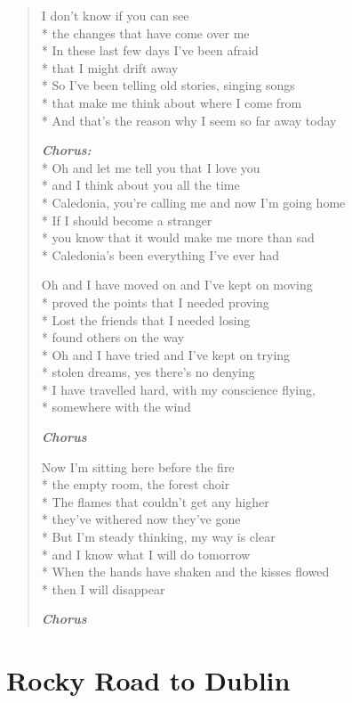 \documentclass[9pt,twoside]{extarticle}
\newenvironment{xverse}{
	\begin{verse}
	\fontsize{8.5}{10.5}\selectfont
	}
	{
	\end{verse}
	\penalty 0
}
\newcommand{\chorusdef}{\textbf{\emph{Chorus:}}\\*}
\newcommand{\chorusmark}[1][1]{%
\vspace{-0.5\stanzaskip}%
\textbf{\emph{Chorus \ifthenelse{\equal{#1}{1}}{}{$\times$ #1}}}%
\vspace{-0.5\stanzaskip}%
}
\begin{document}
\begin{xverse}
I don’t know if you can see \\*
the changes that have come over me \\*
In these last few days I’ve been afraid \\*
that I might drift away \\*
So I’ve been telling old stories, singing songs \\*
that make me think about where I come from \\*
And that’s the reason why I seem so far away today

\chorusdef
Oh and let me tell you that I love you \\*
and I think about you all the time \\*
Caledonia, you’re calling me and now I’m going home \\*
If I should become a stranger \\*
you know that it would make me more than sad \\*
Caledonia’s been everything I’ve ever had

Oh and I have moved on and I’ve kept on moving \\*
proved the points that I needed proving \\*
Lost the friends that I needed losing \\*
found others on the way \\*
Oh and I have tried and I’ve kept on trying \\*
stolen dreams, yes there’s no denying \\*
I have travelled hard, with my conscience flying, \\*
somewhere with the wind

\chorusmark

Now I’m sitting here before the fire \\*
the empty room, the forest choir \\*
The flames that couldn’t get any higher \\*
they’ve withered now they’ve gone \\*
But I’m steady thinking, my way is clear \\*
and I know what I will do tomorrow \\*
When the hands have shaken and the kisses flowed \\*
then I will disappear

\chorusmark
\end{xverse}

\section{Rocky Road to Dublin}
\end{document}
